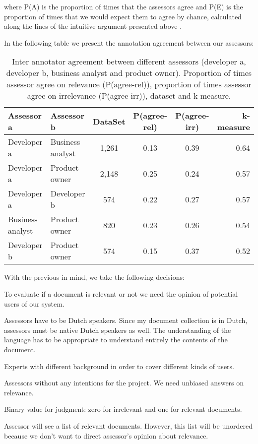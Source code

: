 where P(A) is the proportion of times that the assessors agree and P(E) is the proportion of times that we would expect them to agree by chance, calculated along the lines of the intuitive argument presented above \cite{Carletta}.

In the following table we present the annotation agreement between our assessors:

\begin{table}[H]
\begin{center}
\footnotesize
\caption{Inter annotator agreement between different assessors (developer a, developer b, business analyst and product owner). Proportion of times assessor agree on relevance (P(agree-rel)), proportion of times assessor agree on irrelevance (P(agree-irr)), dataset and k-measure. }
\begin{tabular}{llcccr}
\midrule
 Assessor a & Assessor b & DataSet & P(agree-rel) & P(agree-irr) & k-measure \\
 \midrule
	Developer a & Business analyst & 1,261 & 0.13 & 0.39 & 0.64 \\
	Developer a & Product owner & 2,148 & 0.25 & 0.24 & 0.57 \\
	Developer a & Developer b & 574 & 0.22 & 0.27 & 0.57 \\
	Business analyst & Product owner & 820 & 0.23 & 0.26 & 0.54 \\
	Developer b & Product owner & 574 & 0.15 & 0.37 & 0.52 \\
\bottomrule
\end{tabular}
\end{center}
\end{table}


With the previous in mind, we take the following decisions:

\begin{list}{.}{}
\item{To evaluate if a document is relevant or not  we need the opinion of potential users of our system.}
\item{Assessors have to be Dutch speakers. Since my document collection is in Dutch, assessors must be native Dutch speakers as well. The understanding of the language has to be appropriate to understand entirely the contents of the document.}
\item{Experts with different background in order to cover different kinds of users.}
\item{Assessors without any intentions for the project. We need unbiased answers on relevance.}
\item{Binary value for judgment: zero for irrelevant and one for relevant documents.}
\item{Assessor will see a list of relevant documents. However, this list will be unordered because we don't want to direct assessor's opinion about relevance.}
\end{list}





